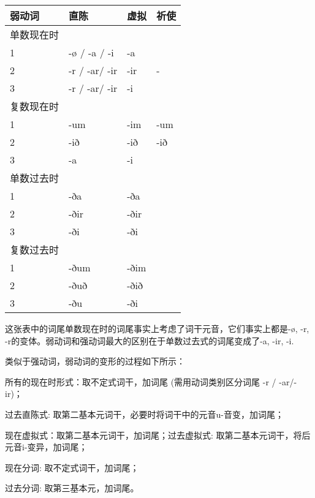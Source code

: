 \begin{longtable}{llll}
    \toprule
    弱动词     & 直陈          & 虚拟 & 祈使 \\
    \midrule
    \endhead
    \bottomrule
    \endfoot
    单数现在时 &               &      &      \\
    1          & -ø / -a / -i  & -a   &      \\
    2          & -r / -ar/ -ir & -ir  & -    \\
    3          & -r / -ar/ -ir & -i   &      \\
    复数现在时 &               &      &      \\
    1          & -um           & -im  & -um  \\
    2          & -ið           & -ið  & -ið  \\
    3          & -a            & -i   &      \\
    单数过去时 &               &      &      \\
    1          & -ða           & -ða  &      \\
    2          & -ðir          & -ðir &      \\
    3          & -ði           & -ði  &      \\
    复数过去时 &               &      &      \\
    1          & -ðum          & -ðim &      \\
    2          & -ðuð          & -ðið &      \\
    3          & -ðu           & -ði  &      \\
\end{longtable}

这张表中的词尾单数现在时的词尾事实上考虑了词干元音，它们事实上都是-ø, -r, -r的变体。弱动词和强动词最大的区别在于单数过去式的词尾变成了-a, -ir, -i.

类似于强动词，弱动词的变形的过程如下所示：

\begin{info}

    所有的现在时形式：取不定式词干，加词尾 (需用动词类别区分词尾 -r / -ar/-ir)；

    过去直陈式: 取第二基本元词干，必要时将词干中的元音u-音变，加词尾；

    现在虚拟式：取第二基本元词干，加词尾；过去虚拟式: 取第二基本元词干，将后元音i-变异，加词尾；

    现在分词: 取不定式词干，加词尾；

    过去分词: 取第三基本元，加词尾。
\end{info}

